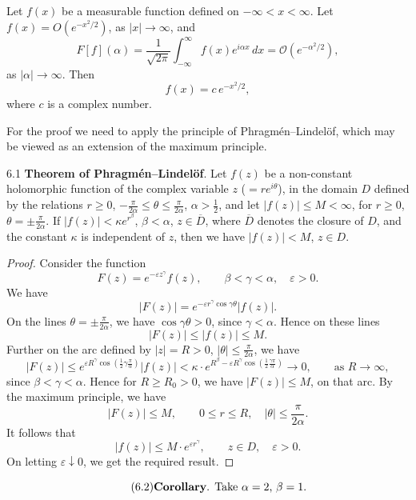 \begin{theorem}\label{thm:II-9}
Let $f(x)$ be a measurable function defined on $-\infty<x<\infty$. Let $f(x)=O(e^{-x^{2}/2})$, as $|x|\to\infty$, and
\[
F[f](\alpha)=\frac{1}{\sqrt{2\pi}}\int_{-\infty}^{\infty}f(x)e^{i\alpha x}\,dx
=\mathcal O(e^{-\alpha^{2}/2}),
\]
as $|\alpha|\to\infty$. Then
\[
f(x)=c\,e^{-x^{2}/2},
\]
where $c$ is a complex number.
\end{theorem}

For the proof we need to apply the principle of Phragm\'en--Lindel\"of, which may be viewed as an extension of the maximum principle.

\begin{nstmt}{6.1}\label{eq:II-6.1}
\textbf{Theorem of Phragm\'en--Lindel\"of}. Let $f(z)$ be a non-constant holomorphic function of the complex variable $z$ ($=re^{i\theta}$), in the domain $D$ defined by the relations $r\ge 0$, $-\frac{\pi}{2\alpha}\le\theta\le\frac{\pi}{2\alpha}$, $\alpha>\frac{1}{2}$, and let $|f(z)|\le M<\infty$, for $r\ge 0$, $\theta=\pm\frac{\pi}{2\alpha}$. If $|f(z)|<\kappa e^{r^{\beta}}$, $\beta<\alpha$, $z\in\overline{D}$, where $\overline{D}$ denotes the closure of $D$, and the constant $\kappa$ is independent of $z$, then we have $|f(z)|<M$, $z\in D$.
\end{nstmt}
\begin{proof}
Consider the function
\[
F(z)=e^{-\varepsilon z^{\gamma}}f(z),\qquad \beta<\gamma<\alpha,\quad \varepsilon>0.
\]
We have
\[
|F(z)|=e^{-\varepsilon r^{\gamma}\cos\gamma\theta}|f(z)|.
\]
On the lines $\theta=\pm\frac{\pi}{2\alpha}$, we have $\cos\gamma\theta>0$, since $\gamma<\alpha$. Hence on these lines
\[
|F(z)|\le |f(z)|\le M.
\]
Further on the arc defined by $|z|=R>0$, $|\theta|\le\frac{\pi}{2\alpha}$, we have
\[
|F(z)|\le e^{\varepsilon R^{\gamma}\cos(\frac{1}{2}\gamma\frac{\pi}{\alpha})}|f(z)|
<\kappa\cdot e^{R^{\beta}-\varepsilon R^{\gamma}\cos(\frac{1}{2}\frac{\gamma\pi}{\alpha})}\to 0,\qquad\text{as }R\to\infty,
\]
since $\beta<\gamma<\alpha$. Hence for $R\ge R_{0}>0$, we have $|F(z)|\le M$, on that arc. By the maximum principle, we have
\[
|F(z)|\le M,\qquad 0\le r\le R,\quad |\theta|\le\frac{\pi}{2\alpha}.
\]
It follows that
\[
|f(z)|\le M\cdot e^{\varepsilon r^{\gamma}},\qquad z\in D,\quad \varepsilon>0.
\]
On letting $\varepsilon\downarrow 0$, we get the required result.
\end{proof}

\begin{equation*}\tag{6.2}\label{eq:II-6.2}
\text{\textbf{Corollary}. Take $\alpha=2$, $\beta=1$.}
\end{equation*}

